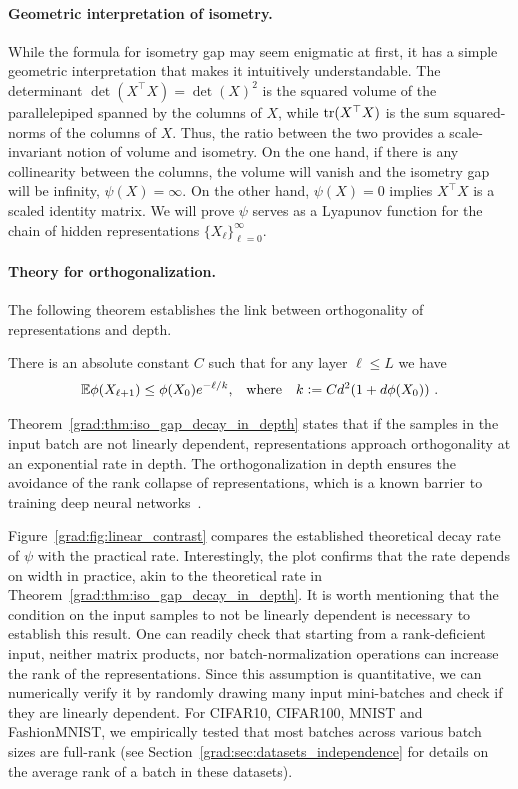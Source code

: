 \paragraph{Geometric interpretation of isometry.}
While the formula for isometry gap may seem enigmatic at first, it has a simple geometric interpretation that makes it intuitively understandable. The determinant $\det(X^\top X) = \det(X)^2$ is the squared volume of the parallelepiped spanned by the columns of $X$, while $\mathrm{tr}(X^\top X)$ is the sum squared-norms of the columns of $X$. Thus, the ratio between the two provides a scale-invariant notion of volume and isometry. On the one hand, if there is any collinearity between the columns, the volume will vanish and the isometry gap will be infinity, $\psi(X) = \infty$. On the other hand, $\psi(X) = 0$ implies $X^\top X$ is a scaled identity matrix. We will prove $\psi$ serves as a Lyapunov function for the chain of hidden representations $\{X_\ell\}_{\ell=0}^\infty$.

\paragraph{Theory for orthogonalization.}
The following theorem establishes the link between orthogonality of representations and depth. 
\begin{theorem}
\label{grad:thm:iso_gap_decay_in_depth}
There is an absolute constant $C$ such that for any layer $\ell \leq L$ we have
\begin{align}
    &\mathbb{E} \phi(X_{\ell+1})\le \phi(X_0)e^{-\ell/k}, & \text{where}&& k:=Cd^2(1+ d\phi(X_0))~.
\end{align}
\end{theorem}



Theorem~\ref{grad:thm:iso_gap_decay_in_depth} states that if the samples in the input batch are not linearly dependent, representations approach orthogonality at an exponential rate in depth. The orthogonalization in depth ensures the avoidance of the rank collapse of representations, which is a known barrier to training deep neural networks~\cite{daneshmand2020batch,saxe2013exact,bjorck2018understanding}. 

Figure~\ref{grad:fig:linear_contrast}
compares the established theoretical decay rate of $\psi$ with the practical rate. Interestingly, the plot confirms that the rate depends on width in practice, akin to the theoretical rate in Theorem~\ref{grad:thm:iso_gap_decay_in_depth}. It is worth mentioning that the condition on the input samples to not be linearly dependent is necessary to establish this result. One can readily check that starting from a rank-deficient input, neither matrix products, nor batch-normalization operations can increase the rank of the representations. Since this assumption is quantitative, we can numerically verify it by randomly drawing many input mini-batches and check if they are linearly dependent. For CIFAR10, CIFAR100, MNIST and FashionMNIST, we empirically tested that most batches across various batch sizes are full-rank (see Section~\ref{grad:sec:datasets_independence} for details on the average rank of a batch in these datasets). 

